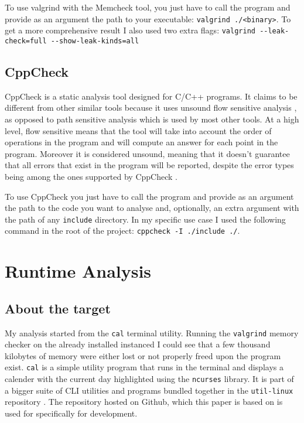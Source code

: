 \documentclass[a4paper,10pt,twocolumn,english]{article}
\begin{document}
To use valgrind with the Memcheck tool, you just have to call the program and provide as an argument the path to your executable: \lstinline{valgrind ./<binary>}. To get a more comprehensive result I also used two extra flags: \lstinline{valgrind --leak-check=full --show-leak-kinds=all}

\subsection{CppCheck}

CppCheck is a static analysis tool designed for C/C++ programs. It claims to be
different from other similar tools because it uses unsound flow sensitive
analysis \cite{cppcheck}, as opposed to path sensitive analysis which is used
by most other tools. At a high level, flow sensitive means that the tool will
take into account the order of operations in the program and will compute an
answer for each point in the program. Moreover it is considered unsound,
meaning that it doesn't guarantee that all errors that exist in the program
will be reported, despite the error types being among the ones supported by
CppCheck \cite{soundness}.

To use CppCheck you just have to call the program and provide as an argument the path to the code you want to analyse and, optionally, an extra argument with the
path of any \lstinline{include} directory. In my specific use case I used the following command in the root of the project: \lstinline{cppcheck -I ./include ./}. 

\section{Runtime Analysis}

\subsection{About the target}

My analysis started from the \lstinline{cal} terminal utility. Running the
\lstinline{valgrind} memory checker on the already installed instanced I could
see that a few thousand kilobytes of memory were either lost or not properly
freed upon the program exist. \lstinline{cal} is a simple utility program that
runs in the terminal and displays a calender with the current day highlighted
using the \lstinline{ncurses} library. It is part of a bigger suite of CLI
utilities and programs bundled together in the \lstinline{util-linux}
repository \cite{git}. The repository hosted on Github, which this paper is
based on is used for specifically for development.
\end{document}
